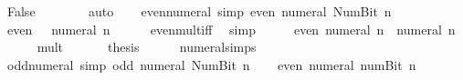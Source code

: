 \begin{isabellebody}
\ False\isanewline
\ \ \ \ \ \ \isamarkupfalse%
\ auto\isanewline
\ \ \isamarkupfalse%
\isanewline
{}\isamarkupfalse%
%
\endisatagproof
{\isafoldproof}%
%
\isadelimproof
\isanewline
%
\endisadelimproof
\isanewline
{}\isamarkupfalse%
\ even{\isacharunderscore}{\kern0pt}numeral\ {\isacharbrackleft}{\kern0pt}simp{\isacharbrackright}{\kern0pt}{\isacharcolon}{\kern0pt}\ {\isachardoublequoteopen}even\ {\isacharparenleft}{\kern0pt}numeral\ {\isacharparenleft}{\kern0pt}Num{\isachardot}{\kern0pt}Bit{}\ n{\isacharparenright}{\kern0pt}{\isacharparenright}{\kern0pt}{\isachardoublequoteclose}\isanewline
%
\isadelimproof
%
\endisadelimproof
%
\isatagproof
{}\isamarkupfalse%
\ {\isacharminus}{\kern0pt}\isanewline
\ \ \isamarkupfalse%
\ {\isachardoublequoteopen}even\ {\isacharparenleft}{\kern0pt}{}\ {\isacharasterisk}{\kern0pt}\ numeral\ n{\isacharparenright}{\kern0pt}{\isachardoublequoteclose}\isanewline
\ \ \ \ \isamarkupfalse%
\ even{\isacharunderscore}{\kern0pt}mult{\isacharunderscore}{\kern0pt}iff\ \isamarkupfalse%
\ simp\isanewline
\ \ \isamarkupfalse%
\ \isamarkupfalse%
\ {\isachardoublequoteopen}even\ {\isacharparenleft}{\kern0pt}numeral\ n\ {\isacharplus}{\kern0pt}\ numeral\ n{\isacharparenright}{\kern0pt}{\isachardoublequoteclose}\isanewline
\ \ \ \ \isamarkupfalse%
\ mult{\isacharunderscore}{\kern0pt}{}\ \isacommand{{\isachardot}{\kern0pt}}\isamarkupfalse%
\isanewline
\ \ \isamarkupfalse%
\ \isamarkupfalse%
\ {\isacharquery}{\kern0pt}thesis\isanewline
\ \ \ \ \isamarkupfalse%
\ numeral{\isachardot}{\kern0pt}simps\ \isacommand{{\isachardot}{\kern0pt}}\isamarkupfalse%
\isanewline
{}\isamarkupfalse%
%
\endisatagproof
{\isafoldproof}%
%
\isadelimproof
\isanewline
%
\endisadelimproof
\isanewline
{}\isamarkupfalse%
\ odd{\isacharunderscore}{\kern0pt}numeral\ {\isacharbrackleft}{\kern0pt}simp{\isacharbrackright}{\kern0pt}{\isacharcolon}{\kern0pt}\ {\isachardoublequoteopen}odd\ {\isacharparenleft}{\kern0pt}numeral\ {\isacharparenleft}{\kern0pt}Num{\isachardot}{\kern0pt}Bit{}\ n{\isacharparenright}{\kern0pt}{\isacharparenright}{\kern0pt}{\isachardoublequoteclose}\isanewline
%
\isadelimproof
%
\endisadelimproof
%
\isatagproof
{}\isamarkupfalse%
\isanewline
\ \ \isamarkupfalse%
\ {\isachardoublequoteopen}even\ {\isacharparenleft}{\kern0pt}numeral\ {\isacharparenleft}{\kern0pt}num{\isachardot}{\kern0pt}Bit{}\ n{\isacharparenright}{\kern0pt}{\isacharparenright}{\kern0pt}{\isachardoublequoteclose}\isanewline

\end{isabellebody}
